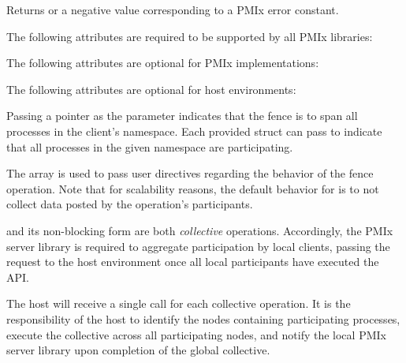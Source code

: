 Returns  or a negative value corresponding to a PMIx error constant.

\reqattrstart
The following attributes are required to be supported by all \ac{PMIx} libraries:


\reqattrend

\optattrstart
The following attributes are optional for \ac{PMIx} implementations:



The following attributes are optional for host environments:


\optattrend

\descr

Passing a  pointer as the  parameter indicates that the fence is to span all processes in the client's namespace.
Each provided  struct can pass  to indicate that all processes in the given namespace are participating.

The  array is used to pass user directives regarding the behavior of the fence operation. Note that for scalability reasons, the default behavior for  is to not collect data posted by the operation's participants.

\adviceimplstart
{} and its non-blocking form are both \emph{collective} operations. Accordingly, the \ac{PMIx} server library is required to aggregate participation by local clients, passing the request to the host environment once all local participants have executed the \ac{API}.
\adviceimplend

\advicermstart
The host will receive a single call for each collective operation. It is the responsibility of the host to identify the nodes containing participating processes, execute the collective across all participating nodes, and notify the local \ac{PMIx} server library upon completion of the global collective.
\advicermend


\section{}

